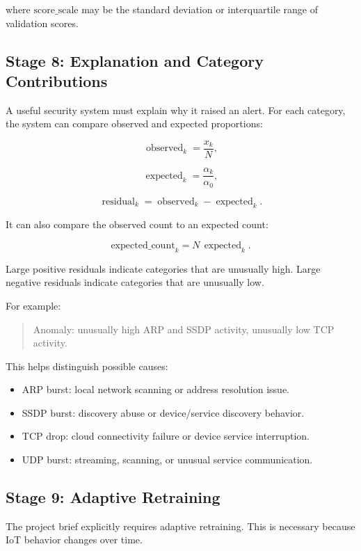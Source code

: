 \documentclass[11pt,a4paper]{article}
\begin{document}
where \(\mathrm{score\_scale}\) may be the standard deviation or interquartile range of validation scores.

\subsection{Stage 8: Explanation and Category Contributions}

A useful security system must explain why it raised an alert. For each category, the system can compare observed and expected proportions:

\[
\operatorname{observed}_k=\frac{x_k}{N},
\]

\[
\operatorname{expected}_k=\frac{\alpha_k}{\alpha_0},
\]

\[
\operatorname{residual}_k
=
\operatorname{observed}_k-\operatorname{expected}_k.
\]

It can also compare the observed count to an expected count:

\[
\mathrm{expected\_count}_k=N\,\operatorname{expected}_k.
\]

Large positive residuals indicate categories that are unusually high. Large negative residuals indicate categories that are unusually low.

For example:

\begin{quote}
Anomaly: unusually high ARP and SSDP activity, unusually low TCP activity.
\end{quote}

This helps distinguish possible causes:

\begin{itemize}
  \item ARP burst: local network scanning or address resolution issue.
  \item SSDP burst: discovery abuse or device/service discovery behavior.
  \item TCP drop: cloud connectivity failure or device service interruption.
  \item UDP burst: streaming, scanning, or unusual service communication.
\end{itemize}

\subsection{Stage 9: Adaptive Retraining}

The project brief explicitly requires adaptive retraining. This is necessary because IoT behavior changes over time.
\end{document}
